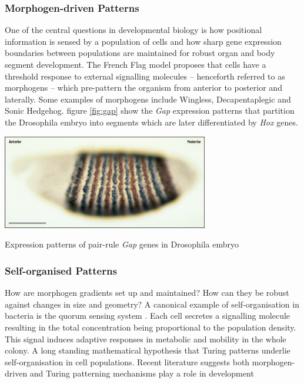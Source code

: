 \subsubsection{Morphogen-driven Patterns}
One of the central questions in developmental biology is how positional information is
sensed by a population of cells and how sharp gene expression boundaries between
populations are maintained for robust organ and body segment development. The
French Flag model \cite{Wolpert1969PositionalDifferentiation.} proposes that cells
have a threshold response to external signalling molecules -- henceforth referred
to as morphogens -- which pre-pattern the organism from anterior to posterior and
laterally. Some examples of morphogens include Wingless, Decapentaplegic and Sonic Hedgehog.
figure \ref{fig:gap} show the \textit{Gap} expression patterns that partition the
Drosophila embryo into segments which are later differentiated by \textit{Hox} genes.

\begin{Figure}
\includegraphics[width=90mm]{figures/gap.jpg}
\caption{Expression patterns of pair-rule \textit{Gap} genes in Drosophila embryo \cite{}}
\label{fig:gap}
\end{Figure}

\subsubsection{Self-organised Patterns}
How are morphogen gradients set up and maintained? How can they be robust against
changes in size and geometry? A canonical example of self-organisation in bacteria
is the quorum sensing system \cite{Miller2002QuorumBacteria}. Each cell secretes a
signalling molecule resulting in the total concentration being proportional to
the population density. This signal induces adaptive responses in metabolic and
mobility in the whole colony. A long standing mathematical hypothesis that
Turing patterns underlie self-organisation in cell populations. Recent literature
suggests both morphogen-driven and Turing patterning mechanisms play a role in development 
\cite{Green2015PositionalCombine}

